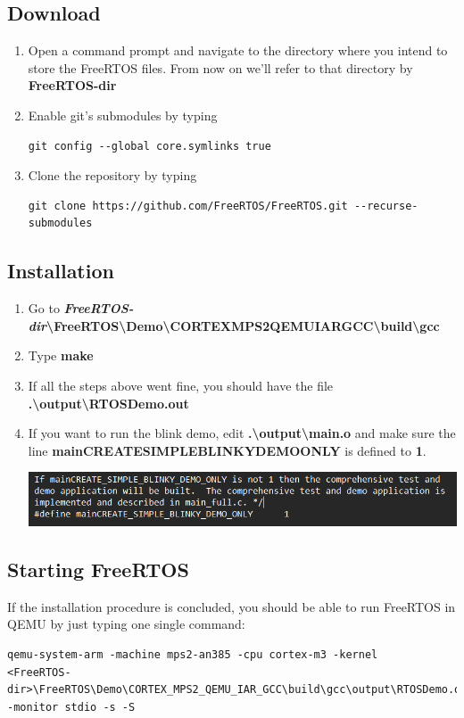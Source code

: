 \documentclass{article}
\begin{document}
\subsection{Download}
\begin{enumerate}
    \item Open a command prompt and navigate to the directory where you intend to store the FreeRTOS files. From now on we'll refer to that directory by \textbf{FreeRTOS-dir}
    \item Enable git's submodules by typing \begin{verbatim}git config --global core.symlinks true\end{verbatim}
    \item Clone the repository by typing \begin{verbatim}git clone https://github.com/FreeRTOS/FreeRTOS.git --recurse-submodules\end{verbatim}
\end{enumerate}

\subsection{Installation}
\begin{enumerate}
    \item Go to \textbf{\textit{FreeRTOS-dir}\textbackslash FreeRTOS\textbackslash Demo\textbackslash CORTEX\textunderscore MPS2\textunderscore QEMU\textunderscore IAR\textunderscore GCC\textbackslash build\textbackslash gcc}
    \item Type \textbf{make}
    \item If all the steps above went fine, you should have the file \textbf{.\textbackslash output\textbackslash RTOSDemo.out}
    \item If you want to run the blink demo, edit \textbf{.\textbackslash output\textbackslash main.o} and make sure the line \textbf{mainCREATE\textunderscore SIMPLE\textunderscore BLINKY\textunderscore DEMO\textunderscore ONLY} is defined to \textbf{1}.

    \includegraphics[width=\textwidth]{4}
\end{enumerate}

\subsection{Starting FreeRTOS}
If the installation procedure is concluded, you should be able to run FreeRTOS in QEMU by just typing one single command:
\begin{verbatim}
qemu-system-arm -machine mps2-an385 -cpu cortex-m3 -kernel
<FreeRTOS-dir>\FreeRTOS\Demo\CORTEX_MPS2_QEMU_IAR_GCC\build\gcc\output\RTOSDemo.out
-monitor stdio -s -S
\end{verbatim}
\end{document}
